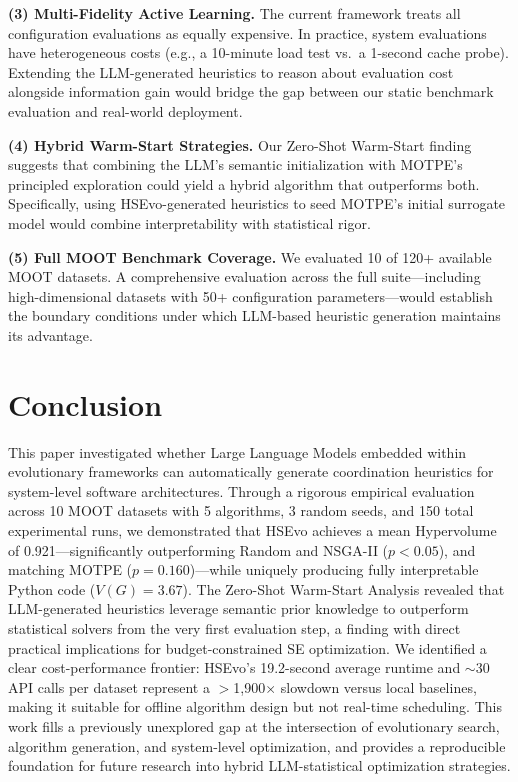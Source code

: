 \documentclass[sigconf,nonacm]{acmart}
\begin{document}
\textbf{(3) Multi-Fidelity Active Learning.} The current framework treats all configuration evaluations as equally expensive. In practice, system evaluations have heterogeneous costs (e.g., a 10-minute load test vs.\ a 1-second cache probe). Extending the LLM-generated heuristics to reason about evaluation cost alongside information gain would bridge the gap between our static benchmark evaluation and real-world deployment.

\textbf{(4) Hybrid Warm-Start Strategies.} Our Zero-Shot Warm-Start finding suggests that combining the LLM's semantic initialization with MOTPE's principled exploration could yield a hybrid algorithm that outperforms both. Specifically, using HSEvo-generated heuristics to seed MOTPE's initial surrogate model would combine interpretability with statistical rigor.

\textbf{(5) Full MOOT Benchmark Coverage.} We evaluated 10 of 120+ available MOOT datasets. A comprehensive evaluation across the full suite---including high-dimensional datasets with 50+ configuration parameters---would establish the boundary conditions under which LLM-based heuristic generation maintains its advantage.

\section{Conclusion}

This paper investigated whether Large Language Models embedded within evolutionary frameworks can automatically generate coordination heuristics for system-level software architectures. Through a rigorous empirical evaluation across 10 MOOT datasets with 5 algorithms, 3 random seeds, and 150 total experimental runs, we demonstrated that HSEvo achieves a mean Hypervolume of 0.921---significantly outperforming Random and NSGA-II ($p<0.05$), and matching MOTPE ($p=0.160$)---while uniquely producing fully interpretable Python code ($V(G) = 3.67$). The Zero-Shot Warm-Start Analysis revealed that LLM-generated heuristics leverage semantic prior knowledge to outperform statistical solvers from the very first evaluation step, a finding with direct practical implications for budget-constrained SE optimization. We identified a clear cost-performance frontier: HSEvo's 19.2-second average runtime and $\sim$30 API calls per dataset represent a $>$1,900$\times$ slowdown versus local baselines, making it suitable for offline algorithm design but not real-time scheduling. This work fills a previously unexplored gap at the intersection of evolutionary search, algorithm generation, and system-level optimization, and provides a reproducible foundation for future research into hybrid LLM-statistical optimization strategies.
\end{document}
